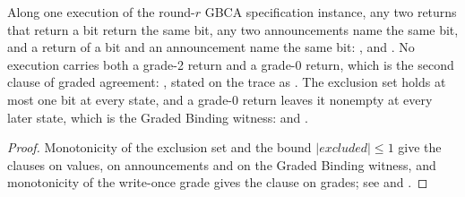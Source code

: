 \begin{theorem}
  \label{thm:gbca-spec-binding}
  \leanok
  Along one execution of the round-$r$ GBCA specification instance, any two returns that return a bit return the same bit, any two announcements name the same bit, and a return of a bit and an announcement name the same bit: ,  and .
  No execution carries both a grade-2 return and a grade-0 return, which is the second clause of graded agreement: , stated on the trace as .
  The exclusion set holds at most one bit at every state, and a grade-0 return leaves it nonempty at every later state, which is the Graded Binding witness:  and .
\end{theorem}

\begin{proof}\leanok
  Monotonicity of the exclusion set and the bound $|excluded| \le 1$ give the clauses on values, on announcements and on the Graded Binding witness, and monotonicity of the write-once grade gives the clause on grades; see  and .
\end{proof}
